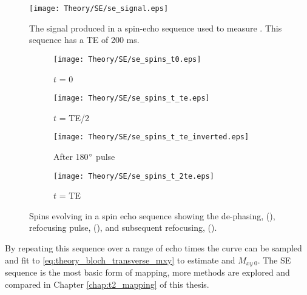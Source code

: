 \begin{figure}[H]
	\centering
	\texttt{[image: Theory/SE/se\_signal.eps]}
	\caption{The signal produced in a spin-echo sequence used to measure \ttwo. This sequence has a \ac{TE} of 200 ms.}
	\label{fig:theory_se_signal}	
\end{figure}

\begin{figure}[H]
	\centering
	\begin{subfigure}[c]{0.24\textwidth}
		\centering
		\texttt{[image: Theory/SE/se\_spins\_t0.eps]}
		\caption{$t$ = 0}
		\label{fig:theory_se_spins_t0}
	\end{subfigure}
	\hfill
	\begin{subfigure}[c]{0.24\textwidth}
		\centering
		\texttt{[image: Theory/SE/se\_spins\_t\_te.eps]}
		\caption{$t$ = TE/2}
		\label{fig:theory_se_spins_t_te_by_2}
	\end{subfigure}
	\begin{subfigure}[c]{0.24\textwidth}
		\centering
		\texttt{[image: Theory/SE/se\_spins\_t\_te\_inverted.eps]}
		\caption{After 180$\degree$ pulse}
		\label{fig:theory_se_spins_t_te_by_2_inverted}
	\end{subfigure}
	\begin{subfigure}[c]{0.24\textwidth}
		\centering
		\texttt{[image: Theory/SE/se\_spins\_t\_2te.eps]}
		\caption{$t$ = TE}
		\label{fig:theory_se_spins_t_te}
	\end{subfigure}
	\caption{Spins evolving in a spin echo sequence showing the de-phasing, (), refocusing pulse, (), and subsequent refocusing, ().}
	\label{fig:theory_se_spins}
\end{figure}

By repeating this sequence over a range of echo times the \ttwo curve can be sampled and fit to \eqref{eq:theory_bloch_transverse_mxy} to estimate \ttwo and $M_{xy\; 0}$. The \ac{SE} sequence is the most basic form of \ttwo mapping, more methods are explored and compared in Chapter \ref{chap:t2_mapping} of this thesis.

